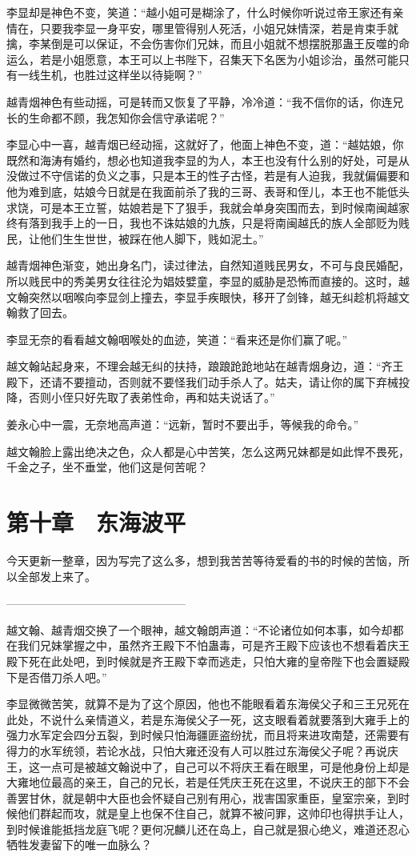 李显却是神色不变，笑道：“越小姐可是糊涂了，什么时候你听说过帝王家还有亲情在，只要我李显一身平安，哪里管得别人死活，小姐兄妹情深，若是肯束手就擒，李某倒是可以保证，不会伤害你们兄妹，而且小姐就不想摆脱那蛊王反噬的命运么，若是小姐愿意，本王可以上书陛下，召集天下名医为小姐诊治，虽然可能只有一线生机，也胜过这样坐以待毙啊？”

越青烟神色有些动摇，可是转而又恢复了平静，冷冷道：“我不信你的话，你连兄长的生命都不顾，我怎知你会信守承诺呢？”

李显心中一喜，越青烟已经动摇，这就好了，他面上神色不变，道：“越姑娘，你既然和海涛有婚约，想必也知道我李显的为人，本王也没有什么别的好处，可是从没做过不守信诺的负义之事，只是本王的性子古怪，若是有人迫我，我就偏偏要和他为难到底，姑娘今日就是在我面前杀了我的三哥、表哥和侄儿，本王也不能低头求饶，可是本王立誓，姑娘若是下了狠手，我就会单身突围而去，到时候南闽越家终有落到我手上的一日，我也不诛姑娘的九族，只是将南闽越氏的族人全部贬为贱民，让他们生生世世，被踩在他人脚下，贱如泥土。”

越青烟神色渐变，她出身名门，读过律法，自然知道贱民男女，不可与良民婚配，所以贱民中的秀美男女往往沦为娼妓嬖童，李显的威胁是恐怖而直接的。这时，越文翰突然以咽喉向李显剑上撞去，李显手疾眼快，移开了剑锋，越无纠趁机将越文翰救了回去。

李显无奈的看看越文翰咽喉处的血迹，笑道：“看来还是你们赢了呢。”

越文翰站起身来，不理会越无纠的扶持，踉踉跄跄地站在越青烟身边，道：“齐王殿下，还请不要擅动，否则就不要怪我们动手杀人了。姑夫，请让你的属下弃械投降，否则小侄只好先取了表弟性命，再和姑夫说话了。”

姜永心中一震，无奈地高声道：“远新，暂时不要出手，等候我的命令。”

越文翰脸上露出绝决之色，众人都是心中苦笑，怎么这两兄妹都是如此悍不畏死，千金之子，坐不垂堂，他们这是何苦呢？

\chapter{第十章　东海波平}

今天更新一整章，因为写完了这么多，想到我苦苦等待爱看的书的时候的苦恼，所以全部发上来了。

————————————————

越文翰、越青烟交换了一个眼神，越文翰朗声道：“不论诸位如何本事，如今却都在我们兄妹掌握之中，虽然齐王殿下不怕蛊毒，可是齐王殿下应该也不想看着庆王殿下死在此处吧，到时候就是齐王殿下幸而逃走，只怕大雍的皇帝陛下也会置疑殿下是否借刀杀人吧。”

李显微微苦笑，就算不是为了这个原因，他也不能眼看着东海侯父子和三王兄死在此处，不说什么亲情道义，若是东海侯父子一死，这支眼看着就要落到大雍手上的强力水军定会四分五裂，到时候只怕海疆匪盗纷扰，而且将来进攻南楚，还需要有得力的水军统领，若论水战，只怕大雍还没有人可以胜过东海侯父子呢？再说庆王，这一点可是被越文翰说中了，自己可以不将庆王看在眼里，可是他身份上却是大雍地位最高的亲王，自己的兄长，若是任凭庆王死在这里，不说庆王的部下不会善罢甘休，就是朝中大臣也会怀疑自己别有用心，戕害国家重臣，皇室宗亲，到时候他们群起而攻，就是皇上也保不住自己，就算不被问罪，这帅印也得拱手让人，到时候谁能抵挡龙庭飞呢？更何况麟儿还在岛上，自己就是狠心绝义，难道还忍心牺牲发妻留下的唯一血脉么？

